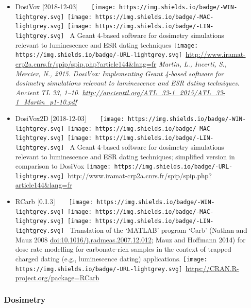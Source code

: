 \documentclass[]{article}
\providecommand{\tightlist}{%
  \setlength{\itemsep}{0pt}\setlength{\parskip}{0pt}}
\begin{document}
\begin{itemize}
\tightlist
\item
  DosiVox {[}2018-12-03{]}~~~~\texttt{[image: https://img.shields.io/badge/-WIN-lightgrey.svg]}~\texttt{[image: https://img.shields.io/badge/-MAC-lightgrey.svg]}~\texttt{[image: https://img.shields.io/badge/-LIN-lightgrey.svg]}~
  A Geant 4-based software for dosimetry simulations relevant to luminescence and ESR dating techniques
  \texttt{[image: https://img.shields.io/badge/-URL-lightgrey.svg]}~\url{http://www.iramat-crp2a.cnrs.fr/spip/spip.php?article144\&lang=fr}
  \emph{Martin, L., Incerti, S., Mercier, N., 2015. DosiVox: Implementing Geant 4-based software for dosimetry simulations relevant to luminescence and ESR dating techniques. Ancient TL 33, 1--10. \url{http://ancienttl.org/ATL_33-1_2015/ATL_33-1_Martin_p1-10.pdf}}
\item
  DosiVox2D {[}2018-12-03{]}~~~~\texttt{[image: https://img.shields.io/badge/-WIN-lightgrey.svg]}~\texttt{[image: https://img.shields.io/badge/-MAC-lightgrey.svg]}~\texttt{[image: https://img.shields.io/badge/-LIN-lightgrey.svg]}~
  A Geant 4-based software for dosimetry simulations relevant to luminescence and ESR dating techniques; simplified version in comparison to DosiVox
  \texttt{[image: https://img.shields.io/badge/-URL-lightgrey.svg]}~\url{http://www.iramat-crp2a.cnrs.fr/spip/spip.php?article144\&lang=fr}
\item
  RCarb {[}0.1.3{]}~~~~\texttt{[image: https://img.shields.io/badge/-WIN-lightgrey.svg]}~\texttt{[image: https://img.shields.io/badge/-MAC-lightgrey.svg]}~\texttt{[image: https://img.shields.io/badge/-LIN-lightgrey.svg]}~
  Translation of the `MATLAB' program `Carb' (Nathan and Mauz 2008 \url{doi:10.1016/j.radmeas.2007.12.012}; Mauz and Hoffmann 2014) for dose rate modelling for carbonate-rich samples in the context of trapped charged dating (e.g., luminescence dating) applications.
  \texttt{[image: https://img.shields.io/badge/-URL-lightgrey.svg]}~\url{https://CRAN.R-project.org/package=RCarb}
\end{itemize}

\hypertarget{dosimetry}{%
\subsubsection{Dosimetry}\label{dosimetry}}
\end{document}
